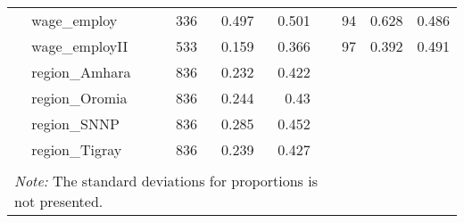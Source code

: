 \begin{table}[ht]
\begin{tabular}{llrrrlrrr}
   & wage\_employ &   336 & 0.497 & 0.501 &  &    94 & 0.628 & 0.486 \\ 
   & wage\_employII &   533 & 0.159 & 0.366 &  &    97 & 0.392 & 0.491 \\ 
   & region\_Amhara &   836 & 0.232 & 0.422 &  &  &  &  \\ 
   & region\_Oromia &   836 & 0.244 &  0.43 &  &  &  &  \\ 
   & region\_SNNP &   836 & 0.285 & 0.452 &  &  &  &  \\ 
   & region\_Tigray &   836 & 0.239 & 0.427 &  &  &  &  \\ 
    \bottomrule   
 \\[-1.8ex] \multicolumn{6}{l}{\footnotesize{\textit{Note:} The standard deviations for proportions is 
               not presented.}} 
\end{tabular}
\end{table}
